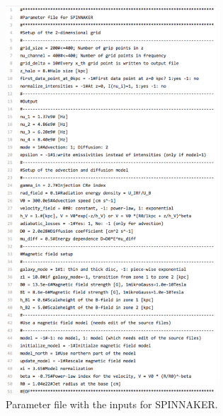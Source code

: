 \documentclass[11pt,twocolumn,a4paper]{article}
\newcommand\spix{{\small SPINNAKER}}
\begin{document}
\begin{figure}
  \centering
  \includegraphics[width=0.7\textwidth]{parameters}
  \caption{Parameter file with the inputs for \spix.}
\label{fig:parameters}
\end{figure}
\end{document}
